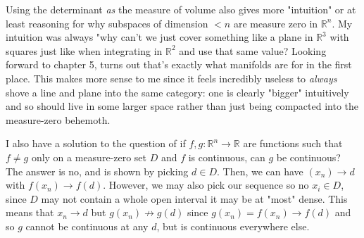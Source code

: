 \documentclass[12pt]{article}
\begin{document}
Using the determinant \emph{as} the measure of volume also gives more "intuition" or at least
reasoning for why subspaces of dimension $< n$ are measure zero in $\mathbb{R}^n$.
My intuition was always "why can't we just cover something like a plane in $\mathbb{R}^3$ with squares
just like when integrating in $\mathbb{R}^2$ and use that same value?
Looking forward to chapter 5, turns out that's exactly what manifolds are for in the first place.
This makes more sense to me since it feels incredibly useless to \emph{always} shove a line and plane into the same category:
one is clearly "bigger" intuitively and so should live in some larger space
rather than just being compacted into the measure-zero behemoth.

I also have a solution to the question of if $f, g \colon \mathbb{R}^n \to \mathbb{R}$
are functions such that $f \ne g$ only on a measure-zero set $D$ and $f$ is continuous,
can $g$ be continuous? 
The answer is no, and is shown by picking $d \in D$.
Then, we can have $(x_n) \to d$ with $f(x_n) \to f(d)$.
However, we may also pick our sequence so no $x_i \in D$,
since $D$ may not contain a whole open interval it may be at "most" dense.
This means that $x_n \to d$ but $g(x_n) \not\to g(d)$ since $g(x_n) = f(x_n) \to f(d)$
and so $g$ cannot be continuous at any $d$, but is continuous everywhere else.
\end{document}
